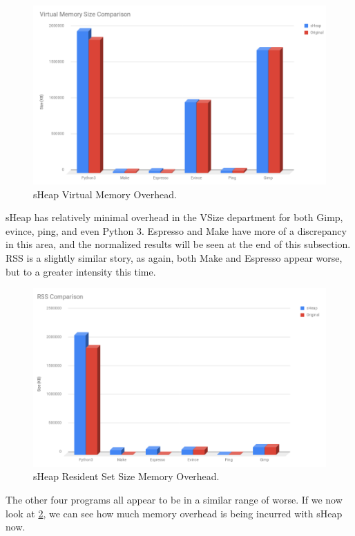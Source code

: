 \documentclass[conference]{IEEEtran}
\begin{document}
\begin{figure}[htbp]
  \centering
  \includegraphics[width=\linewidth]{sheap-vsize-overhead-graph.png}
  \caption{sHeap Virtual Memory Overhead.}
  \label{fig:sheap-vsize-graph}
\end{figure}

sHeap has relatively minimal overhead in the VSize department for both Gimp, evince, ping, 
and even Python 3. Espresso and Make have more of a discrepancy in this area, and the 
normalized results will be seen at the end of this subsection. RSS is a slightly similar 
story, as again, both Make and Espresso appear worse, but to a greater intensity this time.

\begin{figure}[htbp]
  \centering
  \includegraphics[width=\linewidth]{sheap-rss-overhead-graph.png}
  \caption{sHeap Resident Set Size Memory Overhead.}
  \label{fig:sheap-rss-graph}
\end{figure}

The other four programs all appear to be in a similar range of worse. If we now look at 
\ref{fig:sheap-rss-graph}, we can see how much memory overhead is being incurred with sHeap now. 
\end{document}
